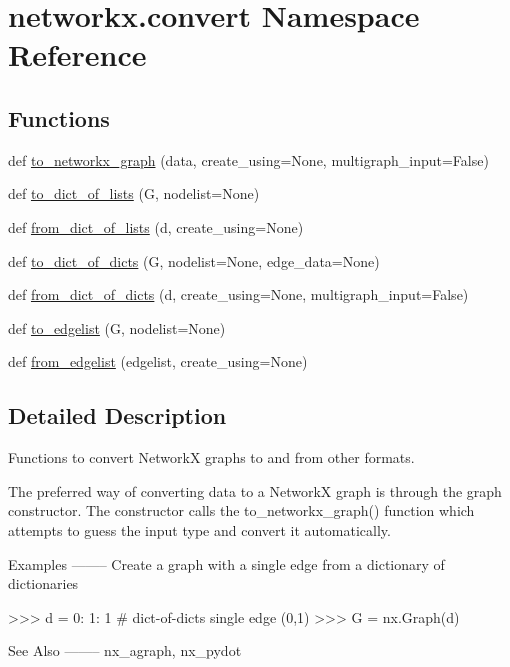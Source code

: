 \hypertarget{namespacenetworkx_1_1convert}{}\section{networkx.\+convert Namespace Reference}
\label{namespacenetworkx_1_1convert}
\subsection*{Functions}
\begin{DoxyCompactItemize}
\item 
def \hyperlink{namespacenetworkx_1_1convert_a7849c4fa2154667a89fff76a6109e3cd}{to\+\_\+networkx\+\_\+graph} (data, create\+\_\+using=None, multigraph\+\_\+input=False)
\item 
def \hyperlink{namespacenetworkx_1_1convert_ac0bae8a707df0fe064309f8d481b695f}{to\+\_\+dict\+\_\+of\+\_\+lists} (G, nodelist=None)
\item 
def \hyperlink{namespacenetworkx_1_1convert_aa8787aba5fcf3417c6602bb7205bce4f}{from\+\_\+dict\+\_\+of\+\_\+lists} (d, create\+\_\+using=None)
\item 
def \hyperlink{namespacenetworkx_1_1convert_a716491bc042d88d9668279ceb4a39900}{to\+\_\+dict\+\_\+of\+\_\+dicts} (G, nodelist=None, edge\+\_\+data=None)
\item 
def \hyperlink{namespacenetworkx_1_1convert_a4cb3971dd768e641b3395e6d245e2cc3}{from\+\_\+dict\+\_\+of\+\_\+dicts} (d, create\+\_\+using=None, multigraph\+\_\+input=False)
\item 
def \hyperlink{namespacenetworkx_1_1convert_ae68ff44e5c1e4c03bd615d59c482ce17}{to\+\_\+edgelist} (G, nodelist=None)
\item 
def \hyperlink{namespacenetworkx_1_1convert_a7ef2c9ebd23b8d1e5dabcce719bc9d18}{from\+\_\+edgelist} (edgelist, create\+\_\+using=None)
\end{DoxyCompactItemize}


\subsection{Detailed Description}
\begin{DoxyVerb}Functions to convert NetworkX graphs to and from other formats.

The preferred way of converting data to a NetworkX graph is through the
graph constructor.  The constructor calls the to_networkx_graph() function
which attempts to guess the input type and convert it automatically.

Examples
--------
Create a graph with a single edge from a dictionary of dictionaries

>>> d = {0: {1: 1}}  # dict-of-dicts single edge (0,1)
>>> G = nx.Graph(d)

See Also
--------
nx_agraph, nx_pydot
\end{DoxyVerb}
 

